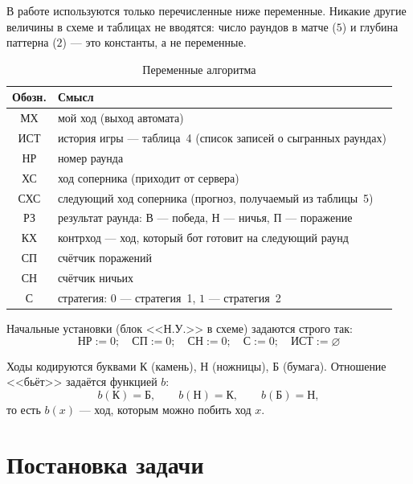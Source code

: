 \documentclass[a4paper,14pt]{extarticle}
\begin{document}
В работе используются только перечисленные ниже переменные. Никакие другие
величины в схеме и таблицах не вводятся: число раундов в матче ($5$) и глубина
паттерна ($2$) --- это константы, а не переменные.

\begin{table}[H]
\centering
\caption{Переменные алгоритма}
\label{tab:vars}
\begin{tabular}{|c|p{11.4cm}|}
\hline
\textbf{Обозн.} & \textbf{Смысл}\\
\hline
МХ  & мой ход (выход автомата)\\
\hline
ИСТ & история игры --- таблица~4 (список записей о сыгранных раундах)\\
\hline
НР  & номер раунда\\
\hline
ХС  & ход соперника (приходит от сервера)\\
\hline
СХС & следующий ход соперника (прогноз, получаемый из таблицы~5)\\
\hline
РЗ  & результат раунда: В --- победа, Н --- ничья, П --- поражение\\
\hline
КХ  & контрход --- ход, который бот готовит на следующий раунд\\
\hline
СП  & счётчик поражений\\
\hline
СН  & счётчик ничьих\\
\hline
С   & стратегия: $0$ --- стратегия~1, $1$ --- стратегия~2\\
\hline
\end{tabular}
\end{table}

Начальные установки (блок <<Н.У.>> в схеме) задаются строго так:
\begin{equation}
\boxed{\;\text{НР}:=0;\quad \text{СП}:=0;\quad \text{СН}:=0;\quad
\text{С}:=0;\quad \text{ИСТ}:=\varnothing\;}
\label{eq:init}
\end{equation}

Ходы кодируются буквами К (камень), Н (ножницы), Б (бумага). Отношение
<<бьёт>> задаётся функцией $b$:
\begin{equation}
b(\text{К})=\text{Б},\qquad b(\text{Н})=\text{К},\qquad b(\text{Б})=\text{Н},
\label{eq:b}
\end{equation}
то есть $b(x)$ --- ход, которым можно побить ход $x$.

\section{Постановка задачи}
\end{document}
